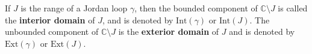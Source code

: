 If $J$ is the range of a Jordan loop $\gamma$, then the bounded component of $\mathbb{C} \setminus J$ is called the \textbf{interior domain} of $J$, and is denoted by $\text{Int}(\gamma)$ or $\text{Int}(J)$. The unbounded component of $\mathbb{C} \setminus J$ is the \textbf{exterior domain} of $J$ and is denoted by $\text{Ext}(\gamma)$ or $\text{Ext}(J)$.
